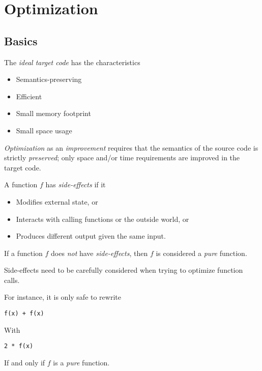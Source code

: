 \section{Optimization}

\subsection{Basics}

\begin{definition}
    The \textit{ideal target code} has the characteristics
    \begin{itemize}
        \item Semantics-preserving
        \item Efficient
        \item Small memory footprint
        \item Small space usage
    \end{itemize}
\end{definition}

\begin{definition}
    \textit{Optimization} as an \textit{improvement} requires that the semantics of the source code is strictly \textit{preserved}; only space and/or time requirements are improved in the target code.
\end{definition}

\begin{definition}
    A function $f$ has \textit{side-effects} if it
    \begin{itemize}
        \item Modifies external state, or
        \item Interacts with calling functions or the outside world, or
        \item Produces different output given the same input.
    \end{itemize}

    If a function $f$ does \textit{not} have \textit{side-effects}, then $f$ is considered a \textit{pure} function.
\end{definition}

\begin{remark}
    Side-effects need to be carefully considered when trying to optimize function calls.
    
    For instance, it is only safe to rewrite
    \begin{verbatim}
f(x) + f(x)
    \end{verbatim}
    
    With
    \begin{verbatim}
2 * f(x)
    \end{verbatim}
    
    If and only if $f$ is a \textit{pure} function.
\end{remark}

